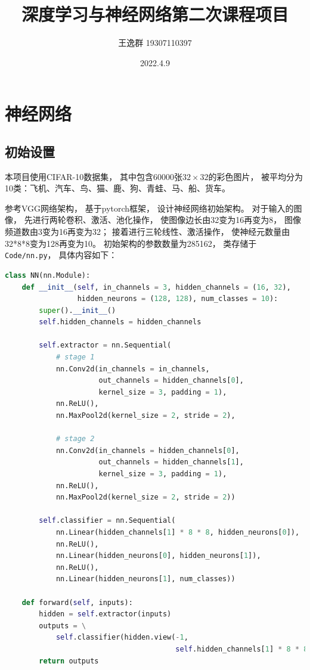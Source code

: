 \documentclass{article}
\title{深度学习与神经网络第二次课程项目}
\author{王逸群 19307110397}
\date{2022.4.9}
\begin{document}
	
\maketitle
\tableofcontents

\section{神经网络}

\subsection{初始设置}

本项目使用CIFAR-10数据集，
其中包含60000张$32\times32$的彩色图片，
被平均分为10类：飞机、汽车、鸟、猫、鹿、狗、青蛙、马、船、货车。

参考VGG网络架构，
基于pytorch框架，
设计神经网络初始架构。
对于输入的图像，
先进行两轮卷积、激活、池化操作，
使图像边长由32变为16再变为8，
图像频道数由3变为16再变为32；
接着进行三轮线性、激活操作，
使神经元数量由32*8*8变为128再变为10。
初始架构的参数数量为285162，
类存储于\verb|Code/nn.py|，
具体内容如下：

\begin{lstlisting}[language=Python]
class NN(nn.Module):
    def __init__(self, in_channels = 3, hidden_channels = (16, 32), 
                 hidden_neurons = (128, 128), num_classes = 10):
        super().__init__()
        self.hidden_channels = hidden_channels

        self.extractor = nn.Sequential(
            # stage 1
            nn.Conv2d(in_channels = in_channels,
                      out_channels = hidden_channels[0],
                      kernel_size = 3, padding = 1),
            nn.ReLU(),
            nn.MaxPool2d(kernel_size = 2, stride = 2),

            # stage 2
            nn.Conv2d(in_channels = hidden_channels[0],
                      out_channels = hidden_channels[1],
                      kernel_size = 3, padding = 1),
            nn.ReLU(),
            nn.MaxPool2d(kernel_size = 2, stride = 2))

        self.classifier = nn.Sequential(
            nn.Linear(hidden_channels[1] * 8 * 8, hidden_neurons[0]),
            nn.ReLU(),
            nn.Linear(hidden_neurons[0], hidden_neurons[1]),
            nn.ReLU(),
            nn.Linear(hidden_neurons[1], num_classes))

    def forward(self, inputs):
        hidden = self.extractor(inputs)
        outputs = \
            self.classifier(hidden.view(-1,
                                        self.hidden_channels[1] * 8 * 8))
        return outputs
\end{lstlisting}
\end{document}
